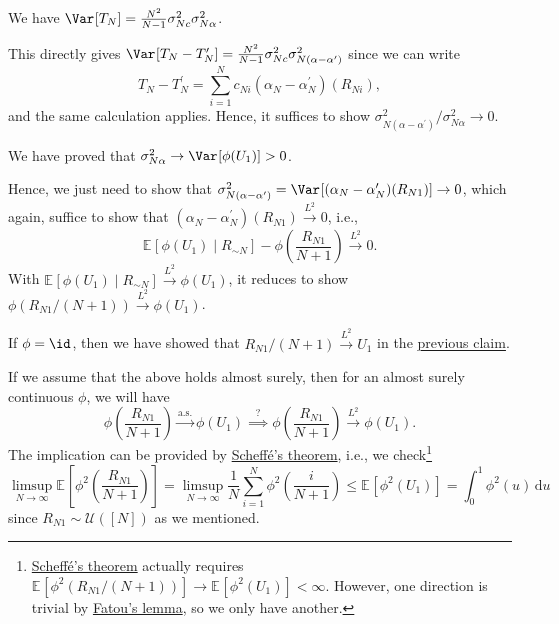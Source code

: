 \begin{prev}
	We have \(\Var_{}[T_N] = \frac{N^2}{N-1} \sigma _{Nc}^2 \sigma _{N \alpha }^2\).
\end{prev}

This directly gives \(\Var_{}[T_N - T_N^{\prime} ] = \frac{N^2}{N-1} \sigma _{Nc}^2 \sigma _{N(\alpha - \alpha ^{\prime} )}^2\) since we can write
\[
	T_N - T_N^{\prime}
	= \sum_{i=1}^{N} c_{Ni} (\alpha _N - \alpha _N^{\prime} )(R_{Ni}),
\]
and the same calculation applies. Hence, it suffices to show \(\sigma _{N(\alpha - \alpha ^{\prime} )}^2 / \sigma _{N \alpha }^2 \to 0\).

\begin{prev}
	We have proved that \(\sigma _{N \alpha }^2 \to \Var_{}[\phi (U_1)] > 0\).
\end{prev}

Hence, we just need to show that \(\sigma _{N(\alpha - \alpha ^{\prime} )}^2 = \Var_{}[(\alpha _N - \alpha _N^{\prime} )(R_{N1})] \to 0\), which again, suffice to show that \((\alpha _N - \alpha _N^{\prime} )(R_{N1}) \overset{L^2}{\to} 0\), i.e.,
\[
	\mathbb{E}_{}[\phi (U_1) \mid R_{\sim N}] - \phi \left( \frac{R_{N1}}{N+1} \right)
	\overset{L^2}{\to} 0.
\]
With \(\mathbb{E}_{}[\phi (U_1) \mid R_{\sim N}] \overset{L^2}{\to} \phi (U_1)\), it reduces to show \(\phi ( R_{N1} / (N+1) ) \overset{L^2}{\to} \phi (U_1)\).

\begin{eg}
	If \(\phi = \id \), then we have showed that \(R_{N1} / (N+1) \overset{L^2}{\to} U_1\) in the \hyperref[clm:lec23]{previous claim}.
\end{eg}

If we assume that the above holds almost surely, then for an almost surely continuous \(\phi \), we will have
\[
	\phi \left( \frac{R_{N1}}{N+1} \right)
	\overset{\text{a.s.} }{\to} \phi (U_1)
	\overset{?}{\implies } \phi \left( \frac{R_{N1}}{N+1} \right) \overset{L^2}{\to} \phi (U_1).
\]
The implication can be provided by \hyperref[thm:Scheffe]{Scheffé's theorem}, i.e., we check\footnote{\hyperref[thm:Scheffe]{Scheffé's theorem} actually requires \(\mathbb{E}_{}[\phi ^2(R_{N1} / (N+1))] \to \mathbb{E}_{}[\phi ^2(U_1)] < \infty \). However, one direction is trivial by \href{https://en.wikipedia.org/wiki/Fatou's_lemma}{Fatou's lemma}, so we only have another.}
\[
	\limsup_{N \to \infty} \mathbb{E}_{}\left[\phi ^2\left( \frac{R_{N1}}{N+1} \right) \right]
	= \limsup_{N \to \infty} \frac{1}{N} \sum_{i=1}^{N} \phi ^2 \left( \frac{i}{N+1} \right)
	\leq \mathbb{E}_{}[\phi ^2(U_1)]
	= \int_{0}^{1} \phi ^2(u) \,\mathrm{d}u
\]
since \(R_{N1} \sim \mathcal{U} ([N])\) as we mentioned.

